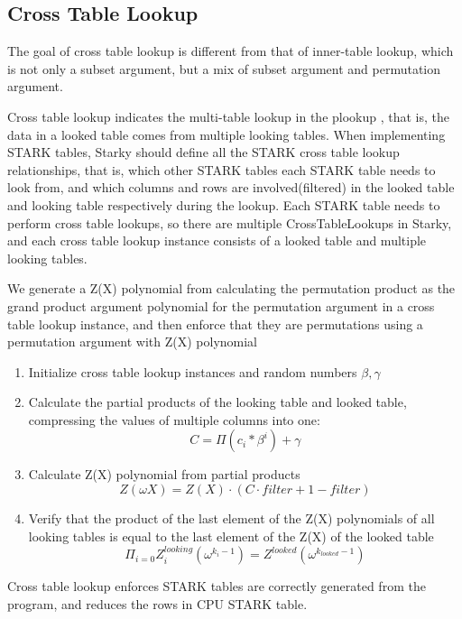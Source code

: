 \subsection{Cross Table Lookup}\label{section: cross-table-lookup}

The goal of cross table lookup is different from that of inner-table lookup, which is not only a subset argument, but a mix of subset argument and permutation argument.

Cross table lookup indicates the multi-table lookup in the plookup \cite{cryptoeprint:2020/315,}, that is, the data in a looked table comes from multiple looking tables. When implementing STARK tables, Starky should define all the STARK cross table lookup relationships, that is, which other STARK tables each STARK table needs to look from, and which columns and rows are involved(filtered) in the looked table and looking table respectively during the lookup. Each STARK table needs to perform cross table lookups, so there are multiple CrossTableLookups in Starky, and each cross table lookup instance consists of a looked table and multiple looking tables.

We generate a Z(X) polynomial from calculating the permutation product as the grand product argument polynomial for the permutation argument in a cross table lookup instance, and then enforce that they are permutations using a permutation argument with Z(X) polynomial

\begin{enumerate}
    \item Initialize cross table lookup instances and random numbers $\beta, \gamma$
    \item Calculate the partial products of the looking table and looked table, compressing the values of multiple columns into one:$$C = \Pi(c_i * \beta^i) + \gamma$$
    \item Calculate Z(X) polynomial from partial products $$Z(\omega X) = Z(X)\cdot (C \cdot filter + 1 - filter)$$
    \item Verify that the product of the last element of the Z(X) polynomials of all looking tables is equal to the last element of the Z(X) of the looked table
    $$\Pi_{i=0} Z^{looking}_{i}(\omega^{k_i-1}) = Z^{looked}(\omega^{k_{looked}-1})$$
\end{enumerate}

Cross table lookup enforces STARK tables are correctly generated from the program, and reduces the rows in CPU STARK table.
